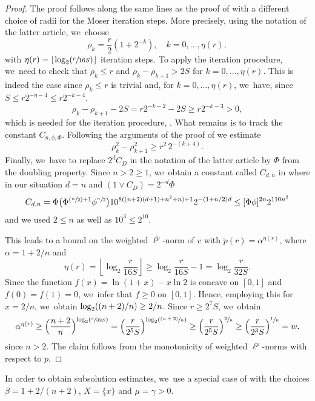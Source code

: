 \documentclass[JEP,XML,SOM,Unicode,published]{cedram}
\newcommand{\Psfrac}[2]{(\sfrac{#1}{#2})}
\newcommand{\Ppsfrac}[2]{(\sfrac{(#1)}{#2})}
\theoremstyle{plain}
\theoremstyle{definition}
\begin{document}
\begin{proof}
The proof follows along the same lines as the proof of \cite[Th.\,2.7]{KellerRose-22a} with a different choice of radii for the Moser iteration steps. More precisely, using the notation of the latter article, we~choose
\[
\rho_k=\frac{r}{2}(1+2^{-k}), \quad k= 0,\ldots, \eta(r),
\]
with $\eta(r)=\left\lfloor\log_2\Psfrac{r}{16S}\right\rfloor$ iteration steps. To apply the iteration procedure, we~need to check that $\rho_{k}\leq r$ and $ \rho_{k}-\rho_{k+1}>2S $ for $ k= 0,\ldots, \eta(r) $. This is indeed the case since $\rho_{k}\leq r$ is trivial and, for $ k= 0,\ldots, \eta(r)$, we~have, since $S\le r2^{-\eta-4}\leq r 2^{-k-4}$,
\[
\rho_k-\rho_{k+1}-2S={r}{2^{-k-2}}-2S\ge {r}{2^{-k-3}}>0,
\]
which is needed for the iteration procedure, \cf \cite[Prop.\,2.6]{KellerRose-22a}. What remains is to track the constant $C_{n,\phi,\Phi}$. Following the arguments of the proof of \cite[Th.\,2.7]{KellerRose-22a} we estimate
\[
\rho_k^2-\rho_{k+1}^2\geq r^2\,2^{-(k+4)}.
\]
Finally, we~have to replace $2^dC_D$ in the notation of the latter article by $\Phi$ from the doubling property. Since $n>2\geq 1$, we~obtain a constant called $ C_{d,n} $ in \cite[Th.\,2.7]{KellerRose-22a} where in our situation $ d=n $ and $ (1\vee C_{D})=2^{-d}\Phi $
\[
C_{d,n}=\Phi\bigl(\Phi^{\Psfrac{n}{2}+1}\phi^{\sfrac{n}{2}}\bigr)10^{8((n+2)(d+1)+n^2+n)+1}2^{-(1+n/2)d}
\leq [\Phi \phi]^{2n}2^{{{110}n^2}}
\]
and we used $ 2\le n $ as well as $ 10^{3}\leq 2^{10} $.

This leads to a bound on the weighted $\ell^{\tilde p}$-norm of $v$
with $\tilde p(r)=\alpha^{\eta(r)}$, where $\alpha=1+2/n$ and
\[
\eta(r)=\left\lfloor\log_2\frac{r}{16S}\right\rfloor\geq \log_2\frac{r}{16S}-1=\log_2\frac{r}{32S}.
\]
Since the function $f(x)=\ln(1+x)- x\ln 2$ is concave on $ [0,1] $ and \hbox{$ f(0)=f(1)=0 $}, we~infer that $ f \ge 0$ on $ [0,1] $. Hence, employing this for $ x=2/n $, we~obtain $\log_2((n+\nobreak2)/n)\geq 2/n$. Since $r\geq 2^7S$, we~obtain
\[
\alpha^{\eta(r)}\geq \Bigl({\frac{n+2}{n}}\Bigr)^{\log_2\Psfrac{r}{32S}}=\Bigl(\frac{r}{2^5S}\Bigr)^{\log_2\Ppsfrac{n+2}{n}}\geq \Bigl(\frac{r}{2^5S}\Bigr)^{\sfrac{2}{n}} \ge \Bigl(\frac{r}{2^{3}S}\Bigr)^{\sfrac{1}{n}}
= w.
\]
since $ n>2 $.
The claim follows from the monotonicity of weighted $\ell^p$-norms with respect to $p$.
\end{proof}

In order to obtain subsolution estimates, we~use a special case of \cite[Th.\,3.4]{KellerRose-22a} with the choices $\beta=1+2/(n+2)$, $X=\{x\}$ and $\mu=\gamma>0$.
\end{document}
